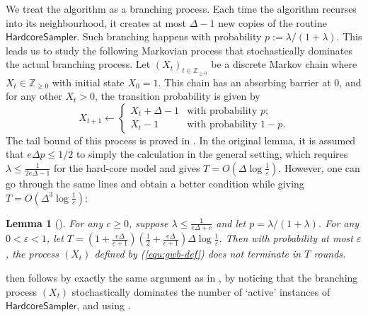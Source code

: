 \documentclass[11pt,a4paper]{amsart}
\newtheorem{lemma}[theorem]{Lemma}
\theoremstyle{definition}
\theoremstyle{remark}
\newcommand{\hcsampler}{\mathsf{HardcoreSampler}}
\begin{document}
We treat the algorithm as a branching process. 
Each time the algorithm recurses into its neighbourhood, it creates at most $\Delta-1$ new copies of the routine $\hcsampler{}$. 
Such branching happens with probability $p:=\lambda/(1+\lambda)$. 
This leads us to study the following Markovian process that stochastically dominates the actual branching process. 
Let $(X_t)_{t\in\mathbb{Z}_{\geq 0}}$ be a discrete Markov chain where $X_t\in\mathbb{Z}_{\geq 0}$ with initial state $X_0=1$. 
This chain has an absorbing barrier at $0$, and for any other $X_t>0$, the transition probability is given by
\begin{equation} \label{equ:gwb-def}
  X_{t+1}\leftarrow\begin{cases}
  X_t+\Delta-1 & \text{with probability } p; \\
  X_t-1 & \text{with probability } 1-p. 
  \end{cases}
\end{equation}
The tail bound of this process is proved in \cite[Lemma B.12]{FGWWY22}. 
In the original lemma, it is assumed that $e\Delta p\leq 1/2$ to simply the calculation in the general setting, which requires $\lambda\leq\frac{1}{2e\Delta-1}$ for the hard-core model and gives $T=O(\Delta\log \frac{1}{\varepsilon})$. 
However, one can go through the same lines and obtain a better condition while giving $T=O(\Delta^3\log \frac{1}{\varepsilon})$: 
\begin{lemma}[{\cite[Lemma B.12]{FGWWY22}}] \label{lem:gwb-terminate}
  For any $c\geq 0$, suppose $\lambda\leq\frac{1}{e\Delta+c}$ and let $p=\lambda/(1+\lambda)$.
  For any $0<\varepsilon<1$, 
  let $T=\left(1+\frac{e\Delta}{c+1}\right)\left(\frac{1}{2}+\frac{e\Delta}{c+1}\right)\Delta\log\frac{1}{\varepsilon}$. 
  Then with probability at most $\varepsilon$, the process $(X_t)$ defined by (\ref{equ:gwb-def}) does not terminate in $T$ rounds.  
\end{lemma}

 then follows by exactly the same argument as in \cite[Proof of Lemma B.10]{FGWWY22}, by noticing that the branching process $(X_t)$ stochastically dominates the number of `active' instances of $\hcsampler$, and using . 
\end{document}
